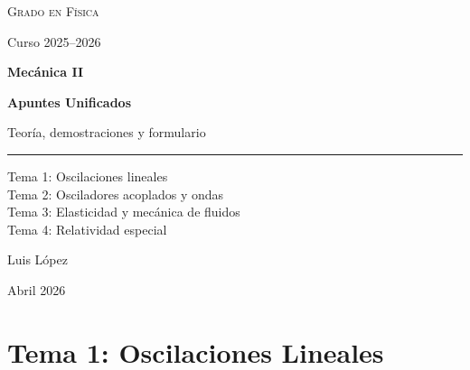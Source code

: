\documentclass[12pt, a4paper]{article}
\theoremstyle{plain}
\theoremstyle{definition}
\theoremstyle{remark}
\begin{document}

\hypersetup{pageanchor=false}
\begin{titlepage}
  \thispagestyle{empty}
  \centering
  \vspace*{2.4cm}

  {\Large\scshape Grado en Física\par}
  \vspace{0.25cm}
  {\normalsize Curso 2025--2026\par}

  \vspace{1.35cm}
  {\Huge\bfseries Mecánica II\par}
  \vspace{0.25cm}
  {\Large\bfseries Apuntes Unificados\par}
  \vspace{0.55cm}
  {\normalsize Teoría, demostraciones y formulario\par}

  \vspace{1.0cm}
  \rule{0.54\linewidth}{0.6pt}
  \vspace{0.95cm}

  \begin{minipage}{0.78\linewidth}
    \centering
    \normalsize
    Tema 1: Oscilaciones lineales\\
    Tema 2: Osciladores acoplados y ondas\\
    Tema 3: Elasticidad y mecánica de fluidos\\
    Tema 4: Relatividad especial
  \end{minipage}

  \vfill
  {\normalsize Luis López\par}
  \vspace{0.15cm}
  {\small Abril 2026\par}
\end{titlepage}
\hypersetup{pageanchor=true}

\tableofcontents

\section{Tema 1: Oscilaciones Lineales}
\end{document}
